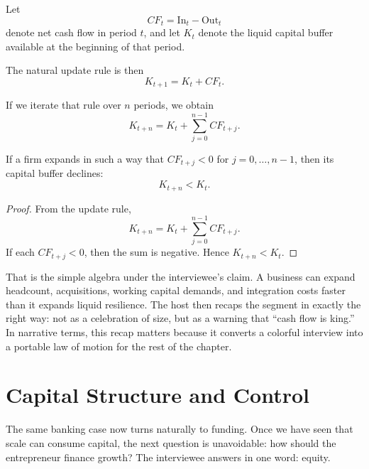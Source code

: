 \begin{definition}
Let
\begin{equation}
CF_t = \mathrm{In}_t - \mathrm{Out}_t
\end{equation}
denote net cash flow in period \(t\), and let \(K_t\) denote the liquid capital buffer available at the beginning of that period.
\end{definition}

The natural update rule is then
\begin{equation}
K_{t+1} = K_t + CF_t.
\end{equation}

If we iterate that rule over \(n\) periods, we obtain
\begin{equation}
K_{t+n} = K_t + \sum_{j=0}^{n-1} CF_{t+j}.
\end{equation}

\begin{proposition}
If a firm expands in such a way that \(CF_{t+j}<0\) for \(j=0,\dots,n-1\), then its capital buffer declines:
\begin{equation}
K_{t+n} < K_t.
\end{equation}
\end{proposition}

\begin{proof}
From the update rule,
\[
K_{t+n} = K_t + \sum_{j=0}^{n-1} CF_{t+j}.
\]
If each \(CF_{t+j}<0\), then the sum is negative. Hence \(K_{t+n}<K_t\).
\end{proof}

That is the simple algebra under the interviewee's claim. A business can expand headcount, acquisitions, working capital demands, and integration costs faster than it expands liquid resilience. The host then recaps the segment in exactly the right way: not as a celebration of size, but as a warning that ``cash flow is king.'' In narrative terms, this recap matters because it converts a colorful interview into a portable law of motion for the rest of the chapter.

\section{Capital Structure and Control}

The same banking case now turns naturally to funding. Once we have seen that scale can consume capital, the next question is unavoidable: how should the entrepreneur finance growth? The interviewee answers in one word: equity.

